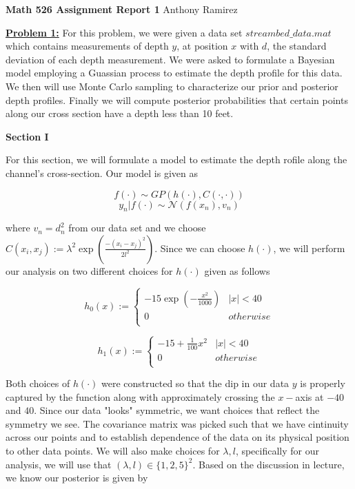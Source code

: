 \documentclass[12pt,leqno]{article}
\begin{document}
	
	\textbf{\large{Math 526} \hspace{0.5in}  \large{Assignment Report 1}}  \hspace{0.5in}  Anthony Ramirez
	
	\vspace{.25in}
	
	\textbf{\underline{Problem 1:}}
	For this problem, we were given a data set $streambed\_data.mat$ which contains measurements of depth $y$, at position $x$ with $d$, the standard deviation of each depth measurement. We were asked to formulate a Bayesian model employing a Guassian process to estimate the depth profile for this data. We then will use Monte Carlo sampling to characterize our prior and posterior depth profiles. Finally we will compute posterior probabilities that certain points along our cross section have a depth less than 10 feet.
	
	\textbf{Section I}
	
	For this section, we will formulate a model to estimate the depth rofile along the channel's cross-section. Our model is given as
	
	\[ f(\cdot) \sim GP\left( h(\cdot), C(\cdot,\cdot) \right) \]
	\[ y_n | f(\cdot) \sim \mathcal{N}(f(x_n),v_n) \]
	
	where $v_n=d_n^2$ from our data set and we choose $C(x_i,x_j):=\lambda^2 \exp\left( \frac{-(x_i-x_j)^2}{2l^2}\right)$. Since we can choose $h(\cdot)$, we will perform our analysis on two different choices for $h(\cdot)$ given as follows
	
	\[ h_0(x) := 
	\begin{cases}
		-15\exp\left( -\frac{x^2}{1000} \right) & |x| < 40 \\
		0 & otherwise \\
	\end{cases}
	 \]
	
		\[ h_1(x) := 
	\begin{cases}
		-15 + \frac{1}{100}x^2& |x| < 40 \\
		0 & otherwise \\
	\end{cases}
	\]
	
	Both choices of $h(\cdot)$ were constructed so that the dip in our data $y$ is properly captured by the function along with approximately crossing the $x-$axis at $-40$ and $40$. Since our data "looks" symmetric, we want choices that reflect the symmetry we see. The covariance matrix was picked such that we have cintinuity across our points and to establish dependence of the data on its physical position to other data points. We will also make choices for $\lambda, l$, specifically for our analysis, we will use that $(\lambda, l) \in \{1,2,5\}^2$. Based on the discussion in lecture, we know our posterior is given by
	
\end{document}
